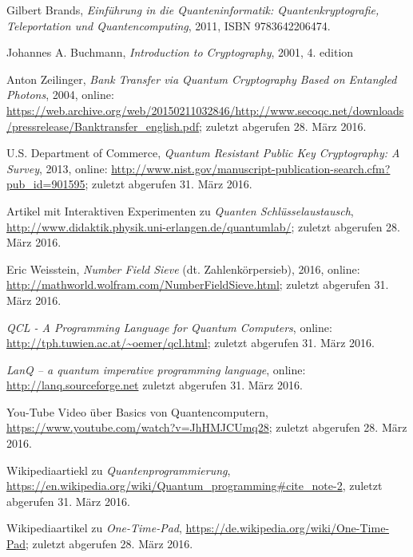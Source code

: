 
\begin{thebibliography}{9}

    Gilbert Brands,
    \emph{Einführung in die Quanteninformatik: Quantenkryptografie, Teleportation und Quantencomputing},
    2011,
    ISBN 9783642206474.

    Johannes A. Buchmann,
    \emph{Introduction to Cryptography},
    2001, 4. edition

    Anton Zeilinger,
    \emph{Bank Transfer via Quantum Cryptography Based on Entangled Photons},
    2004,
    online: \url{https://web.archive.org/web/20150211032846/http://www.secoqc.net/downloads/pressrelease/Banktransfer_english.pdf};
    zuletzt abgerufen 28. März 2016.

    U.S. Department of Commerce,
    \emph{Quantum Resistant Public Key Cryptography: A Survey},
    2013,
    online: \url{http://www.nist.gov/manuscript-publication-search.cfm?pub_id=901595};
    zuletzt abgerufen 31. März 2016.

    Artikel mit Interaktiven Experimenten zu \emph{Quanten Schlüsselaustausch},
    \url{http://www.didaktik.physik.uni-erlangen.de/quantumlab/};
    zuletzt abgerufen 28. März 2016.

    Eric Weisstein,
    \emph{Number Field Sieve} (dt. Zahlenkörpersieb),
    2016,
    online: \url{http://mathworld.wolfram.com/NumberFieldSieve.html};
    zuletzt abgerufen 31. März 2016.


    \emph{QCL - A Programming Language for Quantum Computers},
    online: \url{http://tph.tuwien.ac.at/~oemer/qcl.html};
    zuletzt abgerufen 31. März 2016.

    \emph{LanQ – a quantum imperative programming language},
    online: \url{http://lanq.sourceforge.net}
    zuletzt abgerufen 31. März 2016.


    You-Tube Video über Basics von Quantencomputern,
    \url{https://www.youtube.com/watch?v=JhHMJCUmq28};
    zuletzt abgerufen 28. März 2016.


    Wikipediaartiekl zu \emph{Quantenprogrammierung},
    \url{https://en.wikipedia.org/wiki/Quantum_programming#cite_note-2},
    zuletzt abgerufen 31. März 2016.

    Wikipediaartikel zu \emph{One-Time-Pad},
    \url{https://de.wikipedia.org/wiki/One-Time-Pad};
    zuletzt abgerufen 28. März 2016.


\end{thebibliography}
